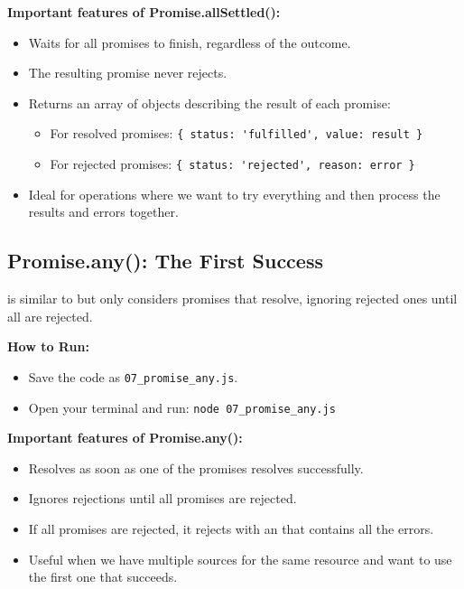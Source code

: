 \textbf{Important features of Promise.allSettled():}
\begin{itemize}
    \item Waits for all promises to finish, regardless of the outcome.
    \item The resulting promise never rejects.
    \item Returns an array of objects describing the result of each promise:
    \begin{itemize}
        \item For resolved promises: \verb|{ status: 'fulfilled', value: result }|
        \item For rejected promises: \verb|{ status: 'rejected', reason: error }|
    \end{itemize}
    \item Ideal for operations where we want to try everything and then process the results and errors together.
\end{itemize}

\subsection{Promise.any(): The First Success}

 is similar to  but only considers promises that resolve, ignoring rejected ones until all are rejected.

\textbf{How to Run:}
\begin{itemize}
    \item Save the code as \verb|07_promise_any.js|.
    \item Open your terminal and run: \verb|node 07_promise_any.js|
\end{itemize}

\begin{macterminal}
  
\end{macterminal}

\textbf{Important features of Promise.any():}
\begin{itemize}
    \item Resolves as soon as one of the promises resolves successfully.
    \item Ignores rejections until all promises are rejected.
    \item If all promises are rejected, it rejects with an  that contains all the errors.
    \item Useful when we have multiple sources for the same resource and want to use the first one that succeeds.
\end{itemize}

